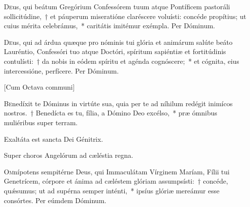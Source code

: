 \documentclass[vesperale_romanum.tex]{subfiles}
\begin{document}
 
 \oratio
\lettrine{D}{e}us, qui beátum Gregórium Confessórem tuum atque Pontíficem pastoráli sollicitúdine,~† et páuperum miseratióne claréscere voluísti: concéde propítius; ut cuius mérita celebrámus,~* caritátis imitémur exémpla.
Per Dóminum.
\newpage
{}
 

 
\oratio

\lettrine{D}{e}us, qui ad árdua quæque pro nóminis tui glória et animárum salúte beáto Lauréntio, Confessóri tuo atque Doctóri, spíritum sapiéntiæ et fortitúdinis contulísti:~† da nobis in eódem spíritu et agénda cognóscere;~* et cógnita, eius intercessióne, perfícere. Per Dóminum.

\newpage
{}

[Cum Octava communi]



\lettrine{B}{e}nedíxit te Dóminus in virtúte sua, quia per te ad níhilum redégit inimícos nostros.~† Benedícta es tu, fília, a Dómino Deo excélso,~* præ ómnibus muliéribus super terram.


\hymnus


\vv Exaltáta est sancta Dei Génitrix.

\rr Super choros Angelórum ad cæléstia regna.

\oratio

\lettrine{O}{m}nípotens sempitérne Deus, qui Immaculátam Vírginem Maríam, Fílii tui Genetrícem, córpore et ánima ad cæléstem glóriam assumpsísti:~† concéde, quǽsumus; ut ad supérna semper inténti,~* ipsíus glóriæ mereámur esse consórtes. Per eúmdem Dóminum.
 

\end{document}

